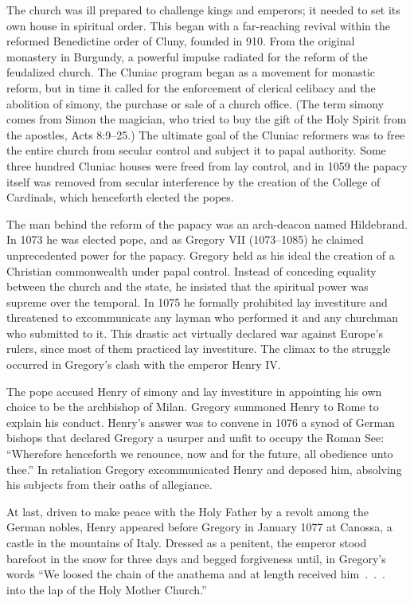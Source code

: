The church was ill prepared to challenge kings and emperors; it needed to set its own house in
spiritual order. This began with a far-reaching revival within the reformed Benedictine order of
Cluny, founded in 910. From the original monastery in Burgundy, a powerful impulse radiated for the
reform of the feudalized church. The Cluniac program began as a movement for monastic reform, but in
time it called for the enforcement of clerical celibacy and the abolition of simony, the purchase or
sale of a church office. (The term simony comes from Simon the magician, who tried to buy the gift
of the Holy Spirit from the apostles, Acts 8:9–25.) The ultimate goal of the Cluniac reformers was
to free the entire church from secular control and subject it to papal authority. Some three hundred
Cluniac houses were freed from lay control, and in 1059 the papacy itself was removed from secular
interference by the creation of the College of Cardinals, which henceforth elected the popes.

The man behind the reform of the papacy was an arch-deacon named Hildebrand. In 1073 he was elected
pope, and as Gregory VII (1073–1085) he claimed unprecedented power for the papacy. Gregory held as
his ideal the creation of a Christian commonwealth under papal control. Instead of conceding
equality between the church and the state, he insisted that the spiritual power was supreme over the
temporal. In 1075 he formally prohibited lay investiture and threatened to excommunicate any layman
who performed it and any churchman who submitted to it. This drastic act virtually declared war
against Europe’s rulers, since most of them practiced lay investiture. The climax to the struggle
occurred in Gregory’s clash with the emperor Henry IV.

The pope accused Henry of simony and lay investiture in appointing his own choice to be the
archbishop of Milan. Gregory summoned Henry to Rome to explain his conduct. Henry’s answer was to
convene in 1076 a synod of German bishops that declared Gregory a usurper and unfit to occupy the
Roman See: “Wherefore henceforth we renounce, now and for the future, all obedience unto thee.” In
retaliation Gregory excommunicated Henry and deposed him, absolving his subjects from their oaths of
allegiance.

At last, driven to make peace with the Holy Father by a revolt among the German nobles, Henry
appeared before Gregory in January 1077 at Canossa, a castle in the mountains of Italy. Dressed as a
penitent, the emperor stood barefoot in the snow for three days and begged forgiveness until, in
Gregory’s words “We loosed the chain of the anathema and at length received him~.~.~. into the lap
of the Holy Mother Church.”

